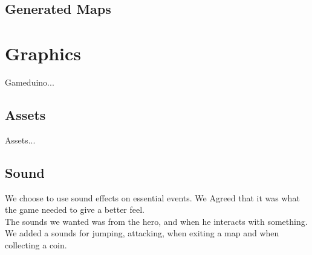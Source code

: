 \subsection{Generated Maps}

\section{Graphics}
Gameduino...

\subsection{Assets}
Assets...

\subsection{Sound} %
We choose to use sound effects on essential events.
We Agreed that it was what the game needed to give a better feel.\\
The sounds we wanted was from the hero, and when he interacts with something.
We added a sounds for jumping, attacking, when exiting a map and when collecting a coin.\\
